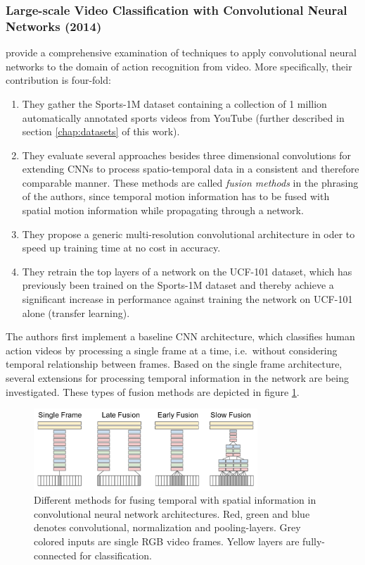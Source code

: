 \subsubsection{Large-scale Video Classification with Convolutional Neural Networks (2014)}
\textcite{karpathy_large-scale_2014} provide a comprehensive examination of techniques to apply convolutional neural networks to the domain of action recognition from video.
More specifically, their contribution is four-fold:
\begin{enumerate}
    \item They gather the Sports-1M dataset containing a collection of 1 million automatically annotated sports videos from YouTube (further described in section \ref{chap:datasets} of this work).
    \item They evaluate several approaches besides three dimensional convolutions for extending CNNs to process spatio-temporal data in a consistent and therefore comparable manner. These methods are called \textit{fusion methods} in the phrasing of the authors, since temporal motion information has to be fused with spatial motion information while propagating through a network.
    \item They propose a generic multi-resolution convolutional architecture in oder to speed up training time at no cost in accuracy.
    \item They retrain the top layers of a network on the UCF-101 dataset, which has previously been trained on the Sports-1M dataset and thereby achieve a significant increase in performance against training the network on UCF-101 alone (transfer learning).
\end{enumerate}

The authors first implement a baseline CNN architecture, which classifies human action videos by processing a single frame at a time, i.e.\ without considering temporal relationship between frames.
Based on the single frame architecture, several extensions for processing temporal information in the network are being investigated. These types of fusion methods are depicted in figure \ref{fig:largescale_fusionmethods}.

\begin{figure}[H]
    \centering
    \includegraphics[width=0.75\textwidth]{img_deep/largescale_fusionmethods}
    \caption{Different methods for fusing temporal with spatial information in convolutional neural network architectures. Red, green and blue denotes convolutional, normalization and pooling-layers. Grey colored inputs are single RGB video frames. Yellow layers are fully-connected for classification. \cite{karpathy_large-scale_2014}}
    \label{fig:largescale_fusionmethods}
\end{figure}

